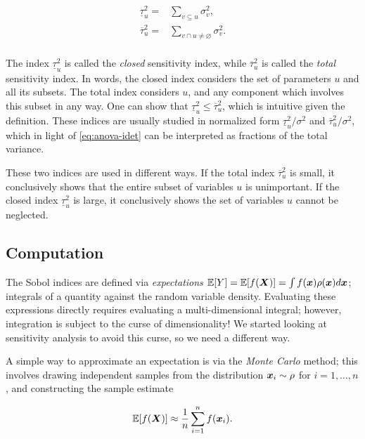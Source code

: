 \documentclass[../primer.tex]{subfiles}
\begin{document}
\begin{equation}\begin{aligned}\label{eq:sobol-indices}
  \underline{\tau}_u^2 = &\sum_{v\subseteq u}\sigma_v^2, \\
  \overline{\tau}_u^2 = &\sum_{v\cap u\neq\varnothing}\sigma_v^2. \\
\end{aligned}\end{equation}

\noindent The index \(\underline{\tau}_u^2\) is called the \emph{closed} sensitivity
index, while \(\overline{\tau}_u^2\) is called the \emph{total} sensitivity index. In
words, the closed index considers the set of parameters \(u\) and all its subsets.
The total index considers \(u\), and any component which involves this subset in
any way. One can show that \(\underline{\tau}_u^2\leq\overline{\tau}_u^2\), which
is intuitive given the definition. These indices are usually studied in
normalized form \(\underline{\tau}_u^2/\sigma^2\) and
\(\overline{\tau}_u^2/\sigma^2\), which in light of \eqref{eq:anova-idet} can be
interpreted as fractions of the total variance.

These two indices are used in different ways. If the total index
\(\overline{\tau}_u^2\) is small, it conclusively shows that the entire subset of
variables \(u\) is unimportant. If the closed index \(\underline{\tau}_u^2\) is
large, it conclusively shows the set of variables \(u\) cannot be neglected.

\subsection{Computation}
\label{sec:orgb2d1060}
The Sobol indices are defined via \emph{expectations} \(\mathbb{E}[Y]=\mathbb{E}[f(\boldsymbol{X})]=\int
f(\boldsymbol{x})\rho(\boldsymbol{x})d\boldsymbol{x}\); integrals of a quantity against the random variable
density. Evaluating these expressions directly requires evaluating a
multi-dimensional integral; however, integration is subject to the curse of
dimensionality! We started looking at sensitivity analysis to avoid this curse,
so we need a different way.

A simple way to approximate an expectation is via the \emph{Monte Carlo} method; this
involves drawing independent samples from the distribution \(\boldsymbol{x}_i\sim\rho\) for
\(i=1,\dots,n\), and constructing the sample estimate

\begin{equation}
  \mathbb{E}[f(\boldsymbol{X})] \approx \frac{1}{n}\sum_{i=1}^n f(\boldsymbol{x}_i).
\end{equation}
\end{document}
